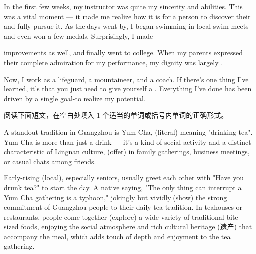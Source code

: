 \documentclass{英语试卷}
\begin{document}
\par In the first few weeks, my instructor was quite  my sincerity and abilities. This was a vital moment — it made me realize how  it is for a person to discover their  and fully pursue it. As the days went by, I began swimming  in local swim meets and even won a few medals. Surprisingly, I made\par
\par {} improvements as well, and finally went to college. When my parents expressed their complete admiration for my performance, my dignity was largely .\par
\par Now, I work as a lifeguard, a mountaineer, and a coach. If there's one thing I've learned, it's that you just need to give yourself a . Everything I've done has been driven by a single goal-to realize my potential.\par
{}
\par 阅读下面短文，在空白处填入 1 个适当的单词或括号内单词的正确形式。\par
\par A standout tradition in Guangzhou is Yum Cha,  (literal) meaning "drinking tea". Yum Cha is more than just a drink — it's a kind of social activity and a distinct characteristic of Lingnan culture,  (offer) in family gatherings, business meetings, or casual chats among friends.\par
\par Early-rising (local), especially seniors, usually greet each other with "Have you drunk tea?" to start the day. A native saying, "The only thing  can interrupt a Yum Cha gathering is a typhoon," jokingly but vividly (show) the strong commitment of Guangzhou people to their daily tea tradition. In teahouses or restaurants, people come together (explore) a wide variety of traditional bite-sized foods, enjoying the social atmosphere and rich cultural heritage (遗产) that accompany the meal, which adds  touch of depth and enjoyment to the tea gathering.\par
\end{document}
